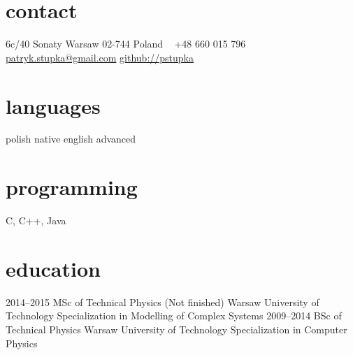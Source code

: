\documentclass[]{friggeri-cv} %
\begin{document}


\begin{aside} %
\section{contact}
6c/40 Sonaty
Warsaw 02-744
Poland
~
+48 660 015 796
~
\href{mailto:patryk.stupka@gmail.com}{patryk.stupka@gmail.com}
\href{https://github.com/pstupka/}{github://pstupka}
\section{languages}
polish native
english advanced
\section{programming}
C, C++, Java
\end{aside}


\section{education}

\begin{entrylist}
\entry
	{2014--2015}
	{MSc {\normalfont of Technical Physics (Not finished)}}
	{Warsaw University of Technology}
	{Specialization in Modelling of Complex Systems}
\entry
	{2009--2014}
	{BSc {\normalfont of Technical Physics}}
	{Warsaw University of Technology}
	{Specialization in Computer Physics}
\end{entrylist}

\end{document}
